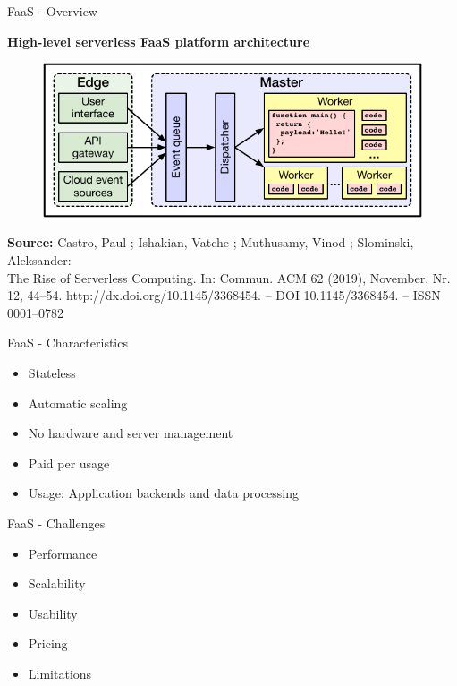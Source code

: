 \documentclass[10pt]{beamer}
\begin{document}
\begin{frame}{FaaS - Overview}
\begin{center}
\textbf{High-level serverless FaaS platform architecture}
\end{center}
\vspace{-1cm}
	\begin{figure}
	\centering
	\includegraphics{bilder/FaaS}
	\end{figure}
	\vspace{-1cm}
	\begin{block}{}
		\linespread{0.8}\selectfont
	\scriptsize \textbf{Source:} Castro, Paul ; Ishakian, Vatche ; Muthusamy, Vinod ; Slominski, Aleksander:\\ The Rise of Serverless Computing. In: Commun. ACM 62 (2019), November, Nr. 12, 44–54. http://dx.doi.org/10.1145/3368454. – DOI 10.1145/3368454. – ISSN 0001–0782
	\end{block}
\end{frame}

\begin{frame}{FaaS - Characteristics}

	\begin{itemize}
		\item Stateless
		\item Automatic scaling
		\item No hardware and server management
		\item Paid per usage
		\item Usage: Application backends and data processing
	\end{itemize}
	

\end{frame}

\begin{frame}{FaaS - Challenges}

	\begin{itemize}
		\item Performance
		\item Scalability
		\item Usability
		\item Pricing
		\item Limitations
	\end{itemize}

\end{frame}
\end{document}

